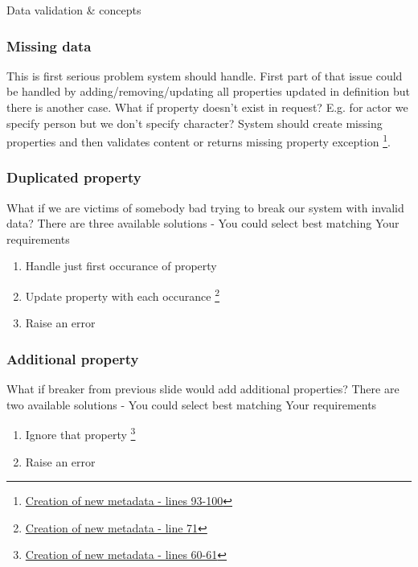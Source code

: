\documentclass{beamer}
\begin{document}
\begin{section}{Data validation \& concepts}
\begin{frame}
\end{frame}

\begin{frame}
\frametitle{Missing data}
This is first serious problem system should handle. First part of that issue could be handled by adding/removing/updating all properties updated in definition but there is another case. \newline \pause
What if property doesn't exist in request? \pause E.g. for actor we specify person but we don't specify character? \pause \newline
System should create missing properties and then validates content or returns missing property exception \footnote[1]{\href{https://github.com/paqaos/DynamicMetadata-SFI2021/blob/main/MovieDatabase/MovieDatabase/CommandStack/CommandHandlers/MovieMetadatas/CreateMovieMetadataCommandHandler.cs}{Creation of new metadata - lines 93-100}}.
\end{frame}

\begin{frame}
\frametitle{Duplicated property}
What if we are victims of somebody bad trying to break our system with invalid data? \pause \newline
There are three available solutions - You could select best matching Your requirements \pause \newline
\begin{enumerate}
	\item Handle just first occurance of property  \pause
	\item Update property with each occurance \footnote[1]{\href{https://github.com/paqaos/DynamicMetadata-SFI2021/blob/main/MovieDatabase/MovieDatabase/CommandStack/CommandHandlers/MovieMetadatas/CreateMovieMetadataCommandHandler.cs}{Creation of new metadata - line 71}} \pause
	\item Raise an error
\end{enumerate}
\end{frame}

\begin{frame}
\frametitle{Additional property}
What if breaker from previous slide would add additional properties? \pause \newline
There are two available solutions - You could select best matching Your requirements \pause \newline
\begin{enumerate}
	\item Ignore that property \footnote[1]{\href{https://github.com/paqaos/DynamicMetadata-SFI2021/blob/main/MovieDatabase/MovieDatabase/CommandStack/CommandHandlers/MovieMetadatas/CreateMovieMetadataCommandHandler.cs}{Creation of new metadata - lines 60-61}}  \pause
	\item Raise an error
\end{enumerate}
\end{frame}


\end{section}
\end{document}

